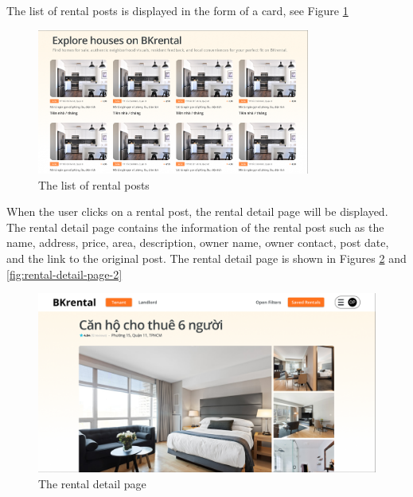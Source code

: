 The list of rental posts is displayed in the form of a card, see Figure \ref{fig:rental-posts}

\begin{figure}[ht]
    \centering
    \includegraphics[width=0.8\textwidth]{Images/Mockup/rental_posts.png}
    \caption{The list of rental posts}
    \label{fig:rental-posts} 
\end{figure}

When the user clicks on a rental post, the rental detail page will be displayed. The rental detail page contains the information of the rental post such as the name, address, price, area, description, owner name, owner contact, post date, and the link to the original post. The rental detail page is shown in Figures \ref{fig:rental-detail-page} and \ref{fig:rental-detail-page-2}

\begin{figure}[ht]
    \centering
    \includegraphics[width=\textwidth]{Images/Mockup/rental_detail_1.png}
    \caption{The rental detail page}
    \label{fig:rental-detail-page}
\end{figure}

